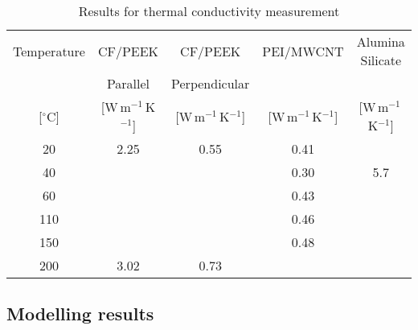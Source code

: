 \begin{table}[ht]
	\centering
	\begin{tabular}{@{}ccccc@{}}
		\toprule
		   Temperature    &           CF/PEEK           &           CF/PEEK           &          PEI/MWCNT          &      Alumina Silicate       \\
		                  &          Parallel           &        Perpendicular        &                             &                             \\
		{[}$^{\circ}$C{]} & {[}W\,m$^{-1}$\,K$^{-1}${]} & {[}W\,m$^{-1}$\,K$^{-1}${]} & {[}W\,m$^{-1}$\,K$^{-1}${]} & {[}W\,m$^{-1}$\,K$^{-1}${]} \\ \midrule
		       20         &            2.25             &            0.55             &            0.41             &                             \\
		       40         &                             &                             &            0.30             &             5.7             \\
		       60         &                             &                             &            0.43             &                             \\
		       110        &                             &                             &            0.46             &                             \\
		       150        &                             &                             &            0.48             &                             \\
		       200        &            3.02             &            0.73             &                             &                             \\ \bottomrule
	\end{tabular}
	\caption{Results for thermal conductivity measurement}
	\label{tab:T2_table2}
\end{table}

\FloatBarrier
\subsection{Modelling results}

